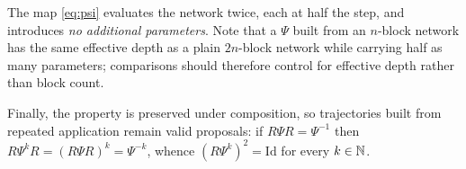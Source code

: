 The map \eqref{eq:psi} evaluates the network twice, each at half the step, and
introduces \emph{no additional parameters}. Note that a $\Psi$ built from an
$n$-block network has the same effective depth as a plain $2n$-block network
while carrying half as many parameters; comparisons should therefore control
for effective depth rather than block count.

Finally, the property is preserved under composition, so trajectories built
from repeated application remain valid proposals: if $R \Psi R = \Psi^{-1}$
then $R \Psi^{k} R = (R\Psi R)^{k} = \Psi^{-k}$, whence
$(R \Psi^{k})^2 = \mathrm{Id}$ for every $k \in \mathbb{N}$.
